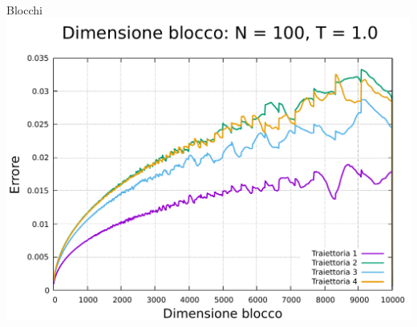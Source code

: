 \begin{frame}
\begin{columns}
\begin{column}{0.33\textwidth}
\begin{block}{Blocchi}
                \centering
                \includegraphics[width=\textwidth]{../ModelloXY/analisi/lblk/err/graphErr/lblk_100_1.0.pdf}

            \end{block}        
        \end{column}
    \end{columns}
\end{frame}



